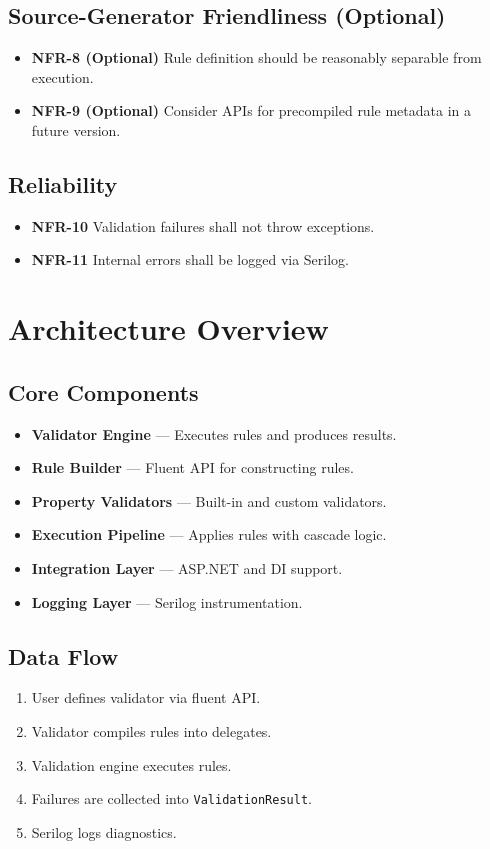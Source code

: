 \documentclass[12pt,technote]{IEEEtran}
\begin{document}
\subsection{Source-Generator Friendliness (Optional)}
\begin{itemize}[noitemsep]
    \item \textbf{NFR-8 (Optional)} Rule definition should be reasonably separable from execution.
    \item \textbf{NFR-9 (Optional)} Consider APIs for precompiled rule metadata in a future version.
\end{itemize}

\subsection{Reliability}
\begin{itemize}[noitemsep]
    \item \textbf{NFR-10} Validation failures shall not throw exceptions.
    \item \textbf{NFR-11} Internal errors shall be logged via Serilog.
\end{itemize}

\section{Architecture Overview}

\subsection{Core Components}
\begin{itemize}[noitemsep]
    \item \textbf{Validator Engine} — Executes rules and produces results.
    \item \textbf{Rule Builder} — Fluent API for constructing rules.
    \item \textbf{Property Validators} — Built-in and custom validators.
    \item \textbf{Execution Pipeline} — Applies rules with cascade logic.
    \item \textbf{Integration Layer} — ASP.NET and DI support.
    \item \textbf{Logging Layer} — Serilog instrumentation.
\end{itemize}

\subsection{Data Flow}
\begin{enumerate}[noitemsep]
    \item User defines validator via fluent API.
    \item Validator compiles rules into delegates.
    \item Validation engine executes rules.
    \item Failures are collected into \texttt{ValidationResult}.
    \item Serilog logs diagnostics.
\end{enumerate}
\end{document}
